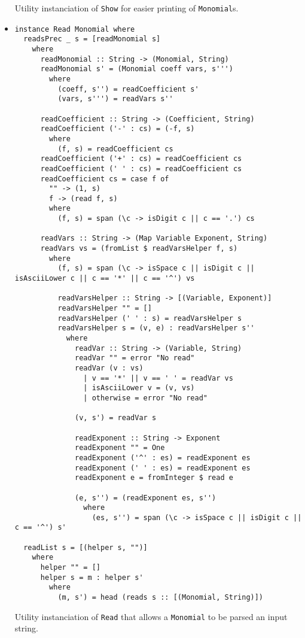 \documentclass[11pt,a4paper]{article}
\begin{document}
\begin{itemize}
          Utility instanciation of \lstinline{Show} for easier printing of \lstinline{Monomial}s.

    \item \begin{lstlisting}
instance Read Monomial where
  readsPrec _ s = [readMonomial s]
    where
      readMonomial :: String -> (Monomial, String)
      readMonomial s' = (Monomial coeff vars, s''')
        where
          (coeff, s'') = readCoefficient s'
          (vars, s''') = readVars s''

      readCoefficient :: String -> (Coefficient, String)
      readCoefficient ('-' : cs) = (-f, s)
        where
          (f, s) = readCoefficient cs
      readCoefficient ('+' : cs) = readCoefficient cs
      readCoefficient (' ' : cs) = readCoefficient cs
      readCoefficient cs = case f of
        "" -> (1, s)
        f -> (read f, s)
        where
          (f, s) = span (\c -> isDigit c || c == '.') cs

      readVars :: String -> (Map Variable Exponent, String)
      readVars vs = (fromList $ readVarsHelper f, s)
        where
          (f, s) = span (\c -> isSpace c || isDigit c || isAsciiLower c || c == '*' || c == '^') vs

          readVarsHelper :: String -> [(Variable, Exponent)]
          readVarsHelper "" = []
          readVarsHelper (' ' : s) = readVarsHelper s
          readVarsHelper s = (v, e) : readVarsHelper s''
            where
              readVar :: String -> (Variable, String)
              readVar "" = error "No read"
              readVar (v : vs)
                | v == '*' || v == ' ' = readVar vs
                | isAsciiLower v = (v, vs)
                | otherwise = error "No read"

              (v, s') = readVar s

              readExponent :: String -> Exponent
              readExponent "" = One
              readExponent ('^' : es) = readExponent es
              readExponent (' ' : es) = readExponent es
              readExponent e = fromInteger $ read e

              (e, s'') = (readExponent es, s'')
                where
                  (es, s'') = span (\c -> isSpace c || isDigit c || c == '^') s'

  readList s = [(helper s, "")]
    where
      helper "" = []
      helper s = m : helper s'
        where
          (m, s') = head (reads s :: [(Monomial, String)])
    \end{lstlisting}

          Utility instanciation of \lstinline{Read} that allows a \lstinline{Monomial} to be parsed an input string.

\end{itemize}
\end{document}
